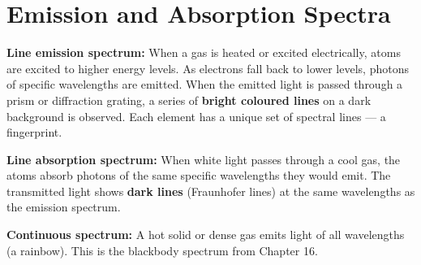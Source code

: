 \section{Emission and Absorption Spectra}

\begin{defbox}
\textbf{Line emission spectrum:} When a gas is heated
or excited electrically, atoms are excited to higher
energy levels. As electrons fall back to lower levels,
photons of specific wavelengths are emitted. When the
emitted light is passed through a prism or diffraction
grating, a series of \textbf{bright coloured lines}
on a dark background is observed. Each element has a
unique set of spectral lines --- a fingerprint.

\textbf{Line absorption spectrum:} When white light
passes through a cool gas, the atoms absorb photons
of the same specific wavelengths they would emit.
The transmitted light shows \textbf{dark lines}
(Fraunhofer lines) at the same wavelengths as the
emission spectrum.

\textbf{Continuous spectrum:} A hot solid or dense
gas emits light of all wavelengths (a rainbow).
This is the blackbody spectrum from Chapter 16.
\end{defbox}

